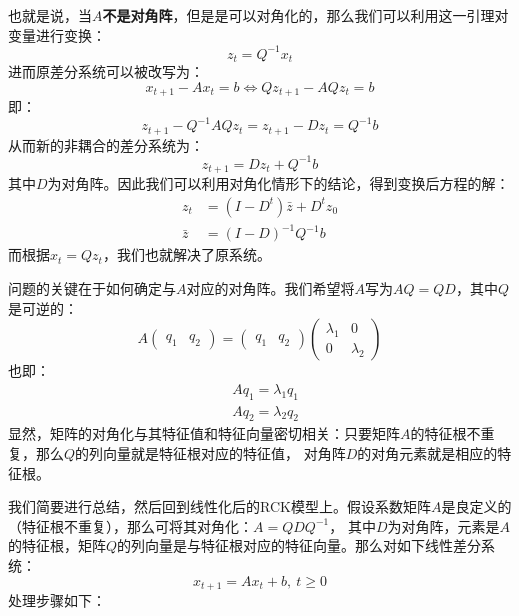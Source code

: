 也就是说，当$A$\textbf{不是对角阵}，但是是可以对角化的，那么我们可以利用这一引理对变量进行变换：
\begin{equation*}
    z_t = Q^{-1}x_t
\end{equation*}
进而原差分系统可以被改写为：
\begin{equation*}
    x_{t+1}-A x_t=b \Longleftrightarrow Q z_{t+1}-A Q z_t=b
\end{equation*}
即：
\begin{equation*}
    z_{t+1}-Q^{-1} A Q z_t=z_{t+1}-D z_t=Q^{-1} b
\end{equation*}
从而新的非耦合的差分系统为：
\begin{equation*}
    z_{t+1} = Dz_t + Q^{-1}b
\end{equation*}
其中$D$为对角阵。因此我们可以利用对角化情形下的结论，得到变换后方程的解：
\begin{equation*}
    \begin{aligned}
        z_t & =\left(I-D^t\right) \bar{z}+D^t z_0 \\
        \bar{z} & =(I-D)^{-1} Q^{-1} b
    \end{aligned}
\end{equation*}
而根据$x_t=Qz_t$，我们也就解决了原系统。

问题的关键在于如何确定与$A$对应的对角阵。我们希望将$A$写为$AQ=QD$，其中$Q$是可逆的：
\[
    A 
    \begin{pmatrix}
        q_1 & q_2
    \end{pmatrix}
    =
    \begin{pmatrix}
        q_1 & q_2
    \end{pmatrix}
    \begin{pmatrix}
        \lambda_1 & 0 \\
        0 & \lambda_2
    \end{pmatrix}
\]
也即：
\begin{equation*}
    \begin{aligned}
        & A q_1=\lambda_1 q_1 \\
        & A q_2=\lambda_2 q_2
    \end{aligned}
\end{equation*}
显然，矩阵的对角化与其特征值和特征向量密切相关：只要矩阵$A$的特征根不重复，那么$Q$的列向量就是特征根对应的特征值，
对角阵$D$的对角元素就是相应的特征根。

我们简要进行总结，然后回到线性化后的RCK模型上。假设系数矩阵$A$是良定义的（特征根不重复），那么可将其对角化：$A=QDQ^{-1}$，
其中$D$为对角阵，元素是$A$的特征根，矩阵$Q$的列向量是与特征根对应的特征向量。那么对如下线性差分系统：
\begin{equation*}
    x_{t+1} = Ax_t + b,~ t\geq 0
\end{equation*}
处理步骤如下：

